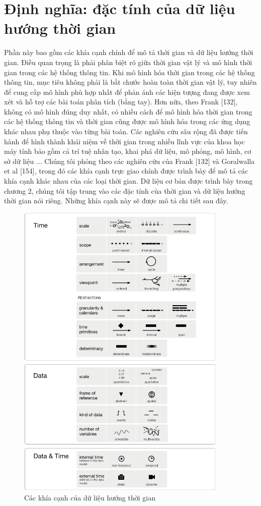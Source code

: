 \section{Định nghĩa: đặc tính của dữ liệu hướng thời gian}
Phần này bao gồm các khía cạnh chính để mô tả thời gian và dữ liệu hướng thời gian. Điều quan trọng là phải phân biệt rõ giữa thời gian vật lý và mô hình thời gian trong các hệ thống thông tin. Khi mô hình hóa thời gian trong các hệ thống thông tin, mục tiêu không phải là bắt chước hoàn toàn thời gian vật lý, tuy nhiên để cung cấp mô hình phù hợp nhất để phản ánh các hiện tượng đang được xem xét và hỗ trợ các bài toán phân tích (bằng tay). Hơn nữa, theo Frank [132], không có mô hình đúng duy nhất, có nhiều cách để mô hình hóa thời gian trong các hệ thống thông tin và thời gian cũng được mô hình hóa trong các ứng dụng khác nhau phụ thuộc vào từng bài toán. Các nghiên cứu sâu rộng đã được tiến hành để hình thành khái niệm về thời gian trong nhiều lĩnh vực của khoa học máy tính bảo gồm cả trí tuệ nhân tạo, khai phá dữ liệu, mô phỏng, mô hình, cơ sở dữ liệu ... Chúng tôi phỏng theo các nghiên cứu của Frank [132] và Goralwalla et al [154], trong đó các khía cạnh trực giao chính được trình bày để mô tả các khía cạnh khác nhau của các loại thời gian. Dữ liệu cơ bản được trình bày trong chương 2, chúng tôi tập trung vào các đặc tính của thời gian và dữ liệu hướng thời gian nói riêng. Những khía cạnh này sẽ được mô tả chi tiết sau đây.



\begin{figure}[H] %
    \centering %
    \includegraphics[width=0.9\textwidth]{assets/fig_7_2.png} 
    \caption{Các khía cạnh của dữ liệu hướng thời gian} %
    \label{fig:fig7.2}
\end{figure}